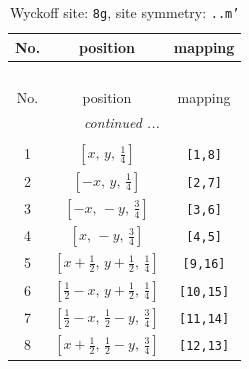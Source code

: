 \documentclass[fleqn,8pt]{jsarticle}
\begin{document}
\begin{longtable}{ccc}
\caption{Wyckoff site: {\tt 8g}, site symmetry: {\tt ..m'}}
 \\
 \hline \hline
No. & position & mapping \\ \hline \endfirsthead

\multicolumn{2}{l}{\tablename\ \thetable{}} \\
 \hline \hline
No. & position & mapping \\ \hline \endhead

 \hline \hline
\multicolumn{2}{r}{\footnotesize\it continued ...} \\ \endfoot

 \hline \hline
\multicolumn{2}{r}{} \\ \endlastfoot

1 & $\left[ x,\, y,\, \frac{1}{4} \right]$ & {\tt [1,8]} \\ \hline
2 & $\left[ - x,\, y,\, \frac{1}{4} \right]$ & {\tt [2,7]} \\ \hline
3 & $\left[ - x,\, - y,\, \frac{3}{4} \right]$ & {\tt [3,6]} \\ \hline
4 & $\left[ x,\, - y,\, \frac{3}{4} \right]$ & {\tt [4,5]} \\ \hline
5 & $\left[ x + \frac{1}{2},\, y + \frac{1}{2},\, \frac{1}{4} \right]$ & {\tt [9,16]} \\ \hline
6 & $\left[ \frac{1}{2} - x,\, y + \frac{1}{2},\, \frac{1}{4} \right]$ & {\tt [10,15]} \\ \hline
7 & $\left[ \frac{1}{2} - x,\, \frac{1}{2} - y,\, \frac{3}{4} \right]$ & {\tt [11,14]} \\ \hline
8 & $\left[ x + \frac{1}{2},\, \frac{1}{2} - y,\, \frac{3}{4} \right]$ & {\tt [12,13]} \\
\end{longtable}
\renewcommand{\arraystretch}{1.2}
\end{document}
